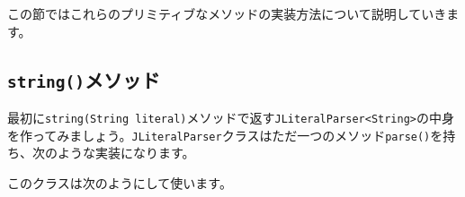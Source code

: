 この節ではこれらのプリミティブなメソッドの実装方法について説明していきます。

\hypertarget{chapter6-stringux30e1ux30bdux30c3ux30c9}{%
\subsection{\texorpdfstring{\texttt{string()}メソッド}{string()メソッド}}\label{chapter6-stringux30e1ux30bdux30c3ux30c9}}

最初に\texttt{string(String\ literal)}メソッドで返す\texttt{JLiteralParser\textless{}String\textgreater{}}の中身を作ってみましょう。\texttt{JLiteralParser}クラスはただ一つのメソッド\texttt{parse()}を持ち、次のような実装になります。

\begin{Shaded}
\begin{Highlighting}[]
\NormalTok{\textgreater{} \{}
   
   \NormalTok{(}

\NormalTok{  \}}
   \NormalTok{\textless{}}\NormalTok{\textgreater{} }\NormalTok{(}
        \NormalTok{\textless{}}\NormalTok{()));}
\NormalTok{    \} }\NormalTok{ \{}
       \NormalTok{;}
\NormalTok{    \}}
\NormalTok{  \}}
\NormalTok{\}}
\end{Highlighting}
\end{Shaded}

このクラスは次のようにして使います。

\begin{Shaded}
\begin{Highlighting}[]
 \NormalTok{\textless{}}\NormalTok{\textgreater{}(}\NormalTok{, }
  \NormalTok{(} \NormalTok{(}\NormalTok{(}\NormalTok{));}
\end{Highlighting}
\end{Shaded}

